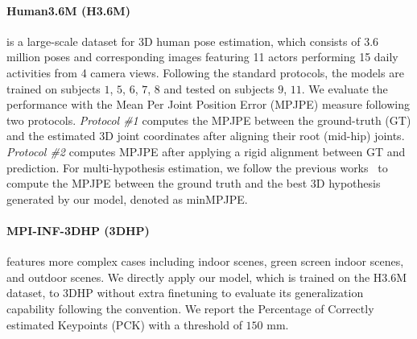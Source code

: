 \documentclass[10pt,twocolumn,letterpaper]{article}
\begin{document}
\paragraph{Human3.6M (H3.6M)~\cite{h36m_pami}} is a large-scale dataset for 3D human pose estimation, which consists of 3.6 million poses and corresponding images featuring 11 actors performing 15 daily activities from 4 camera views. Following the standard protocols, the models are trained on subjects $1$, $5$, $6$, $7$, $8$ and tested on subjects $9$, $11$. We evaluate the performance with the Mean Per Joint Position Error (MPJPE) measure following two protocols. \textit{Protocol \#1} computes the MPJPE between the ground-truth (GT) and the estimated 3D joint coordinates after aligning their root (mid-hip) joints. \textit{Protocol \#2} computes MPJPE after applying a rigid alignment between GT and prediction. For multi-hypothesis estimation, we follow the previous works~\cite{jahangiri2017generating, Li_2019_CVPR, li2020weakly, wehrbein2021probabilistic} to compute the MPJPE between the ground truth and the best 3D hypothesis generated by our model, denoted as minMPJPE.

\vspace{-1.25em}
\paragraph{MPI-INF-3DHP (3DHP)~\cite{mono-3dhp2017}} features more complex cases including indoor scenes, green screen indoor scenes, and outdoor scenes. We directly apply our model, which is trained on the H3.6M dataset, to 3DHP without extra finetuning to evaluate its generalization capability following the convention. We report the Percentage of Correctly estimated Keypoints (PCK) with a threshold of $150$ mm.
\end{document}

